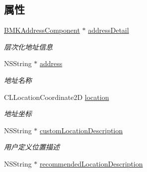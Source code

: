 \subsection*{属性}
\begin{DoxyCompactItemize}
\item 
\hypertarget{interface_b_m_k_cloud_reverse_geo_code_result_a2cb4e89eb2bb1483b6bf8e46ac22c06f}{}\hyperlink{interface_b_m_k_address_component}{B\+M\+K\+Address\+Component} $\ast$ \hyperlink{interface_b_m_k_cloud_reverse_geo_code_result_a2cb4e89eb2bb1483b6bf8e46ac22c06f}{address\+Detail}\label{interface_b_m_k_cloud_reverse_geo_code_result_a2cb4e89eb2bb1483b6bf8e46ac22c06f}

\begin{DoxyCompactList}\small\item\em 层次化地址信息 \end{DoxyCompactList}\item 
\hypertarget{interface_b_m_k_cloud_reverse_geo_code_result_af0182e44ab74a34768176c4a9469056e}{}N\+S\+String $\ast$ \hyperlink{interface_b_m_k_cloud_reverse_geo_code_result_af0182e44ab74a34768176c4a9469056e}{address}\label{interface_b_m_k_cloud_reverse_geo_code_result_af0182e44ab74a34768176c4a9469056e}

\begin{DoxyCompactList}\small\item\em 地址名称 \end{DoxyCompactList}\item 
\hypertarget{interface_b_m_k_cloud_reverse_geo_code_result_ad91bf80c8946b707ffa860b3696537da}{}C\+L\+Location\+Coordinate2\+D \hyperlink{interface_b_m_k_cloud_reverse_geo_code_result_ad91bf80c8946b707ffa860b3696537da}{location}\label{interface_b_m_k_cloud_reverse_geo_code_result_ad91bf80c8946b707ffa860b3696537da}

\begin{DoxyCompactList}\small\item\em 地址坐标 \end{DoxyCompactList}\item 
\hypertarget{interface_b_m_k_cloud_reverse_geo_code_result_aa38fc6ba381e6c4deaa4b792b2d72bdf}{}N\+S\+String $\ast$ \hyperlink{interface_b_m_k_cloud_reverse_geo_code_result_aa38fc6ba381e6c4deaa4b792b2d72bdf}{custom\+Location\+Description}\label{interface_b_m_k_cloud_reverse_geo_code_result_aa38fc6ba381e6c4deaa4b792b2d72bdf}

\begin{DoxyCompactList}\small\item\em 用户定义位置描述 \end{DoxyCompactList}\item 
\hypertarget{interface_b_m_k_cloud_reverse_geo_code_result_a0ef589f2960f2b127174136325ceb033}{}N\+S\+String $\ast$ \hyperlink{interface_b_m_k_cloud_reverse_geo_code_result_a0ef589f2960f2b127174136325ceb033}{recommended\+Location\+Description}\label{interface_b_m_k_cloud_reverse_geo_code_result_a0ef589f2960f2b127174136325ceb033}


\end{DoxyCompactItemize}
